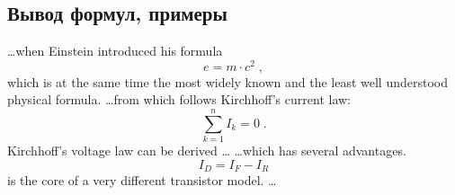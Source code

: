 \documentclass[oneside,final,14pt]{extreport}
\begin{document}
\subsection{Вывод формул, примеры}
\ldots when Einstein introduced his formula
\begin{equation}
    e = m \cdot c^2 \; ,
\end{equation}
which is at the same time the most widely known
and the least well understood physical formula.
\ldots from which follows Kirchhoff's current law:
\begin{equation}
    \sum_{k=1}^{n} I_k = 0 \; .
\end{equation}
Kirchhoff's voltage law can be derived \ldots
\ldots which has several advantages.
\begin{equation}
    I_D = I_F - I_R
\end{equation}
is the core of a very different transistor model. \ldots
\tableofcontents
\end{document}
